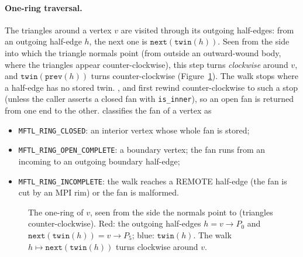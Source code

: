 \paragraph{One-ring traversal.} The triangles around a vertex $v$ are visited through its
outgoing half-edges: from an outgoing half-edge $h$, the next one is
$\texttt{next}(\texttt{twin}(h))$. Seen from the side into which the triangle normals point
(from outside an outward-wound body, where the triangles appear counter-clockwise), this step
turns \emph{clockwise} around $v$, and $\texttt{twin}(\texttt{prev}(h))$ turns
counter-clockwise (Figure~\ref{fig:onering}). The walk stops where a half-edge has no stored
twin. ,  and
 first rewind counter-clockwise to such a stop (unless the caller asserts a closed fan with \texttt{is\_inner}), so an
open fan is returned from one end to the other.  classifies the fan of a
vertex as
\begin{itemize}
  \item \texttt{MFTL\_RING\_CLOSED}: an interior vertex whose whole fan is stored;
  \item \texttt{MFTL\_RING\_OPEN\_COMPLETE}: a boundary vertex; the fan runs from an incoming to
    an outgoing boundary half-edge;
  \item \texttt{MFTL\_RING\_INCOMPLETE}: the walk reaches a REMOTE half-edge (the fan is cut by
    an MPI rim) or the fan is malformed.
\end{itemize}

\begin{figure}[ht]
\centering
{}
\caption{The one-ring of $v$, seen from the side the normals point to (triangles
counter-clockwise). Red: the outgoing half-edges $h=v\to P_0$ and $\texttt{next}(\texttt{twin}(h))
=v\to P_5$; blue: $\texttt{twin}(h)$. The walk $h\mapsto\texttt{next}(\texttt{twin}(h))$ turns
clockwise around $v$.}
\label{fig:onering}
\end{figure}

